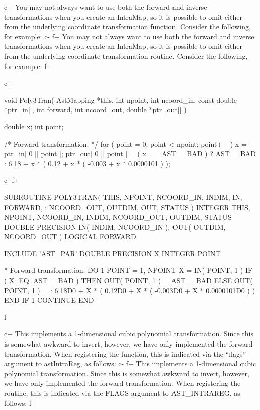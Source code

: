 \documentclass[twoside,11pt]{starlink}
\begin{document}
c+
You may not always want to use both the forward and inverse
transformations when you create an IntraMap, so it is possible to omit
either from the underlying coordinate transformation
function. Consider the following, for example:
c-
f+
You may not always want to use both the forward and inverse
transformations when you create an IntraMap, so it is possible to omit
either from the underlying coordinate transformation routine. Consider
the following, for example:
f-

c+
\small
\begin{terminalv}
void Poly3Tran( AstMapping *this, int npoint, int ncoord_in,
                const double *ptr_in[], int forward, int ncoord_out,
                double *ptr_out[] ) {
   double x;
   int point;

/* Forward transformation. */
   for ( point = 0; point < npoint; point++ ) {
      x = ptr_in[ 0 ][ point ];
      ptr_out[ 0 ][ point ] = ( x == AST__BAD ) ? AST__BAD :
         6.18 + x * ( 0.12 + x * ( -0.003 + x * 0.0000101 ) );
   }
}
\end{terminalv}
\normalsize
c-
f+
\small
\begin{terminalv}
      SUBROUTINE POLY3TRAN( THIS, NPOINT, NCOORD_IN, INDIM, IN, FORWARD,
     :                      NCOORD_OUT, OUTDIM, OUT, STATUS )
      INTEGER THIS, NPOINT, NCOORD_IN, INDIM, NCOORD_OUT, OUTDIM, STATUS
      DOUBLE PRECISION IN( INDIM, NCOORD_IN ), OUT( OUTDIM, NCOORD_OUT )
      LOGICAL FORWARD

      INCLUDE 'AST_PAR'
      DOUBLE PRECISION X
      INTEGER POINT

*  Forward transformation.
      DO 1 POINT = 1, NPOINT
         X = IN( POINT, 1 )
         IF ( X .EQ. AST__BAD ) THEN
            OUT( POINT, 1 ) = AST__BAD
         ELSE
            OUT( POINT, 1 ) =
     :      6.18D0 + X * ( 0.12D0 + X * ( -0.003D0 + X * 0.0000101D0 ) )
         END IF
 1    CONTINUE
      END
\end{terminalv}
\normalsize
f-

c+
This implements a 1-dimensional cubic polynomial transformation. Since
this is somewhat awkward to invert, however, we have only implemented
the forward transformation.  When registering the function, this is
indicated via the ``flags'' argument to astIntraReg, as follows:
c-
f+
This implements a 1-dimensional cubic polynomial transformation. Since
this is somewhat awkward to invert, however, we have only implemented
the forward transformation.  When registering the routine, this is
indicated via the FLAGS argument to AST\_INTRAREG, as follows:
f-
\end{document}
